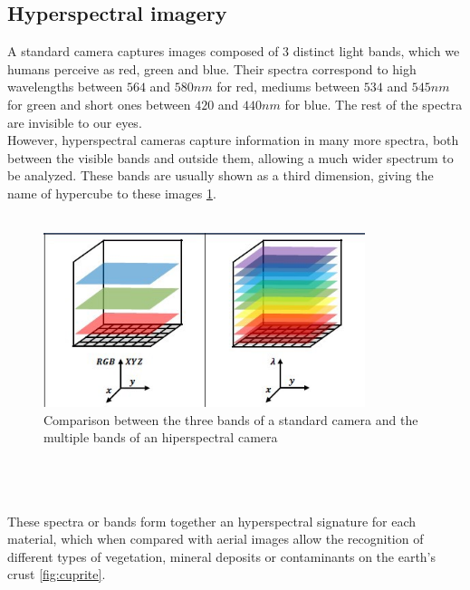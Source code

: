 \subsection{Hyperspectral imagery}
A standard camera captures images composed of 3 distinct light bands, which we humans perceive as red, green and blue. Their spectra correspond to high wavelengths between $564$ and $580 nm$ for red, mediums between $534$ and $545 nm$ for green and short ones between $420$ and $440 nm$ for blue. The rest of the spectra are invisible to our eyes.
\\
However, hyperspectral cameras capture information in many more spectra, both between the visible bands and outside them, allowing a much wider spectrum to be analyzed. These bands are usually shown as a third dimension, giving the name of hypercube to these images \ref{fig:cube}.
\\
\\
\begin{figure}[h!]
\centering
\includegraphics[height=2in]{figures/rgb_vs_hsi.jpeg}
\caption{Comparison between the three bands of a standard camera and the multiple bands of an hiperspectral camera}
  \label{fig:cube}
\end{figure}
\\
\\
\\
These spectra or bands form together an hyperspectral signature for each material, which when compared with aerial images allow the recognition of different types of vegetation, mineral deposits or contaminants on the earth's crust \ref{fig:cuprite}.
\\
\\
